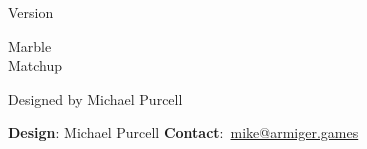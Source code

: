 \documentclass[a6paper, parskip=half, DIV=14, 12pt]{scrartcl}
\begin{document}
{%
\thispagestyle{empty}
		\enlargethispage{3.5\baselineskip} %
\setmainfont[Scale=1.0]{Roboto}
\begin{center}
\makeatletter
{\footnotesize Version \@version}
\makeatother


\vfill

{
\setmainfont[Scale=2.25]{Roboto-Black}
\Huge
Marble\\[0.5ex]Matchup
}

\vspace{-0.5cm}


\vfill{}

{
\setmainfont{Roboto}
\large
Designed by Michael Purcell
}
\end{center}
}

\newpage


\newpage


%
\newpage



\newpage



\vfill

\hrulefill

{\footnotesize \textbf{Design}: Michael Purcell \hfill \textbf{Contact}:~\href{mailto:mike@armiger.games}{mike@armiger.games}}
\end{document}
